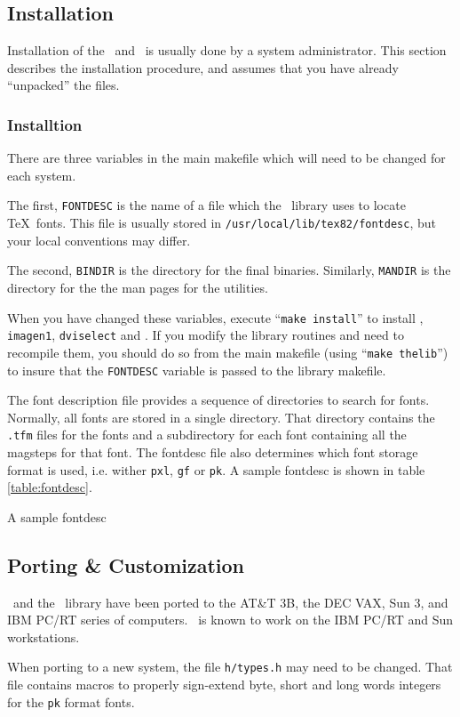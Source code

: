 %
\subsection{Installation}
Installation of the \iptex\ and \texx\ is usually done by a system
administrator.
This section describes the installation procedure, and assumes that you
have already ``unpacked'' the files.
%
\subsubsection{Installtion}
There are three variables in the main makefile which will need to
be changed for each system.

The first, {\tt FONTDESC} is the name of a file which the \dvi\ library
uses to locate \TeX\ fonts.
This file is usually stored in {\tt /usr/local/lib/tex82/fontdesc}, but
your local conventions may differ.

The second, {\tt BINDIR} is the directory for the final binaries.
Similarly, {\tt MANDIR} is the directory for the the man pages for
the utilities.

When you have changed these variables,
execute ``{\tt make install}'' to install
\iptex, {\tt imagen1}, {\tt dviselect} and \texx.
If you modify the library routines and need to recompile them, you
should do so from the main makefile (using ``{\tt make thelib}'')
to insure that the {\tt FONTDESC} variable is passed to the
library makefile.

The font description file provides a sequence of directories to
search for fonts.
Normally, all fonts are stored in a single directory.
That directory contains the {\tt .tfm} files for the fonts
and a subdirectory for each font containing all the magsteps for that font.
The fontdesc file also determines which font storage format is used,
i.e. wither {\tt pxl}, {\tt gf} or {\tt pk}.
A sample fontdesc is shown in table \ref{table:fontdesc}.
%
\begin{table}[hbtn]
\centering

\caption{A sample fontdesc}
\label{table:fontdesc}
\end{table}
%
\subsection{Porting \& Customization}
\iptex\ and the \dvi\ library have been ported to the AT\&T 3B,
the DEC VAX, Sun 3, and IBM PC/RT series of computers.
\texx\ is known to work on the IBM PC/RT and Sun workstations.

When porting to a new system, the file {\tt h/types.h} may need
to be changed.
That file contains macros to properly sign-extend byte, short and long
words integers for the {\tt pk} format fonts.

